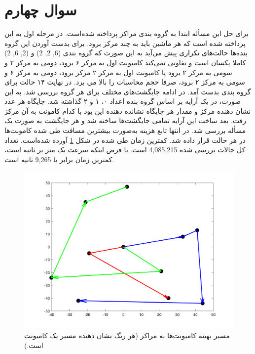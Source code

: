 \section{سوال چهارم}
برای حل این مسأله ابتدا به گروه بندی مراکز پرداخته شده‌است. در مرحله اول به این پرداخته شده است که هر ماشین باید به چند مرکز برود. برای بدست آوردن این گروه بنده‌ها حالت‌های تکراری پیش می‌آید به این صورت که گروه بندی
(6, 2, 2)
و
(2, 6, 2)
کاملا یکسان است و تفاوتی نمی‌کند کامیونت اول به  مرکز ۶  برود، دومی به مرکز ۲  و سومی به مرکز ۲ برود یا کامیونت اول به مرکز ۲ مرکز برود، دومی به مرکز ۶ و سومی به مرکز ۲ برود، صرفا حجم محاسبات را بالا می برد. در نهایت ۱۴ حالت برای گروه بندی بدست آمد. در ادامه جایگشت‌های مختلف برای هر گروه بررسی شد. به این صورت، در یک آٰرایه بر اساس گروه بنده اعداد ۰، ۱ و ۲ گذاشته شد. جایگاه هر عدد نشان دهنده مرکز و مقدار هر جایگاه نشانده دهنده این بود با کدام کامونت به آن مرکز رفت. بعد ساخت این آرایه تمامی جایگشت‌ها ساخته شد و هر جایگشت به صورت یک مسأله 
بررسی شد. در انتها تابع هزینه به‌صورت بیشترین مسافت طی شده کامونت‌ها در هر حالت قرار داده شد. کمترین زمان طی شده در شکل
\ref{best_path_truck}
آورده شده‌است.
تعداد کل حالات بررسی شده
4,085,215
است. با فرض اینکه سرعت یک متر بر ثانیه است، کمترین زمان برابر با 9,265 ثانیه است.
 \begin{figure}[!h]
	\includegraphics[width=12cm]{../Figure/Q4/best_path.png}
	\centering
	\caption{مسیر بهینه کامیونت‌ها به مراکز (هر رنگ نشان دهنده مسیر یک کامیونت است.)}
	\label{best_path_truck}
\end{figure}